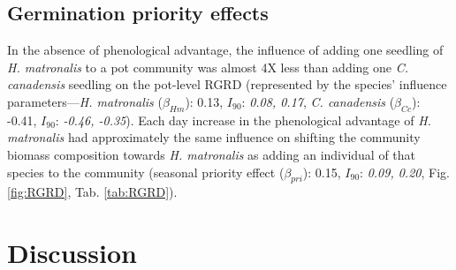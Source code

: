 \documentclass{article}[11pt]
\begin{document}
\subsection*{Germination priority effects} %
In the absence of phenological advantage, the influence  of adding one seedling of \textit{H. matronalis} to a pot community was almost 4X less than adding one \textit{C. canadensis} seedling on the pot-level RGRD (represented by the species' influence parameters---\textit{H. matronalis} ($\beta_{Hm}$): 0.13, $I_{90}$: \textit{0.08, 0.17}, \textit{C. canadensis} ($\beta_{Cc}$): -0.41, $I_{90}$: \textit{-0.46, -0.35}). Each day increase in the phenological advantage of \textit{ H. matronalis} had approximately the same influence on shifting the community biomass composition towards \textit{H. matronalis} as adding an individual of that species to the community (seasonal priority effect ($\beta_{pri}$): 0.15, $I_{90}$: \textit{0.09, 0.20}, Fig. \ref{fig:RGRD}, Tab. \ref{tab:RGRD}). %


\section*{Discussion}
\end{document}
